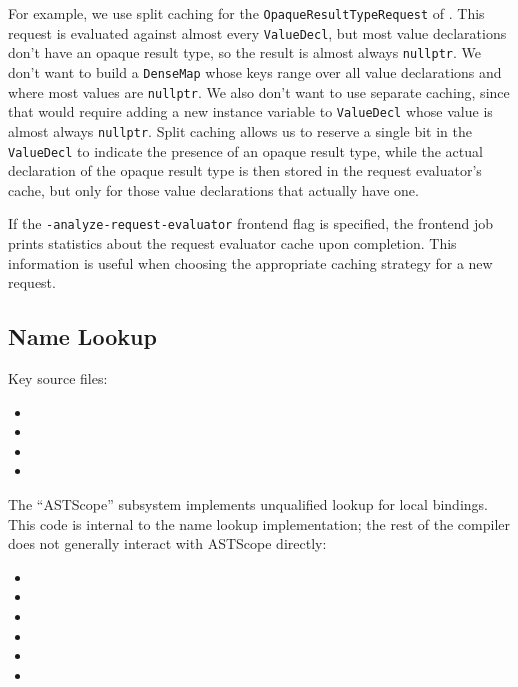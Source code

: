 \documentclass[../generics]{subfiles}
\begin{document}
For example, we use split caching for the \texttt{OpaqueResultTypeRequest} of . This request is evaluated against almost every \texttt{ValueDecl}, but most value declarations don't have an opaque result type, so the result is almost always \texttt{nullptr}. We don't want to build a \texttt{DenseMap} whose keys range over all value declarations and where most values are \texttt{nullptr}. We also don't want to use separate caching, since that would require adding a new instance variable to \texttt{ValueDecl} whose value is almost always \texttt{nullptr}. Split caching allows us to reserve a single bit in the \texttt{ValueDecl} to indicate the presence of an opaque result type, while the actual declaration of the opaque result type is then stored in the request evaluator's cache, but only for those value declarations that actually have one.

If the \texttt{-analyze-request-evaluator} frontend flag is specified, the frontend job prints statistics about the request evaluator cache upon completion. This information is useful when choosing the appropriate caching strategy for a new request.

\subsection*{Name Lookup}

Key source files:
\begin{itemize}
\item {}
\item {}
\item {}
\item {}
\end{itemize}
The ``ASTScope'' subsystem implements unqualified lookup for local bindings. This code is internal to the name lookup implementation; the rest of the compiler does not generally interact with ASTScope directly:
\begin{itemize}
\item {}
\item {}
\item {}
\item {}
\item {}
\item {}
\end{itemize}
\end{document}
